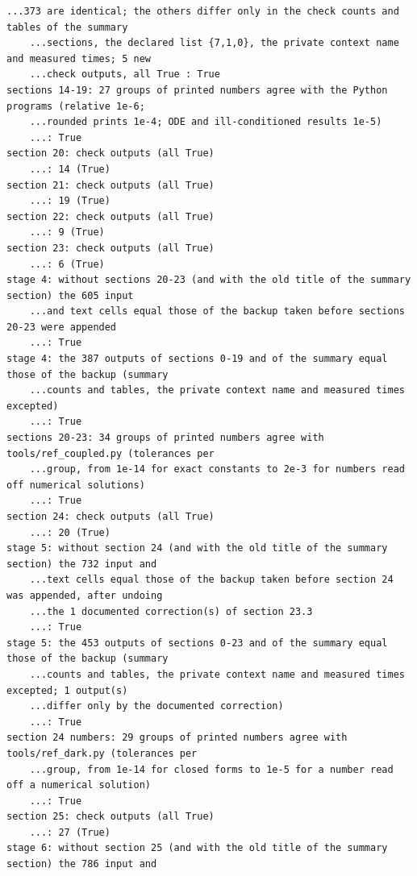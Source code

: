 \documentclass[10pt,a4paper]{article}
\begin{document}
\begin{Verbatim}[fontsize=\small,frame=single,framesep=2mm]
    ...373 are identical; the others differ only in the check counts and tables of the summary
    ...sections, the declared list {7,1,0}, the private context name and measured times; 5 new
    ...check outputs, all True : True
sections 14-19: 27 groups of printed numbers agree with the Python programs (relative 1e-6;
    ...rounded prints 1e-4; ODE and ill-conditioned results 1e-5)                              
    ...: True
section 20: check outputs (all True)                                                           
    ...: 14 (True)
section 21: check outputs (all True)                                                           
    ...: 19 (True)
section 22: check outputs (all True)                                                           
    ...: 9 (True)
section 23: check outputs (all True)                                                           
    ...: 6 (True)
stage 4: without sections 20-23 (and with the old title of the summary section) the 605 input
    ...and text cells equal those of the backup taken before sections 20-23 were appended      
    ...: True
stage 4: the 387 outputs of sections 0-19 and of the summary equal those of the backup (summary
    ...counts and tables, the private context name and measured times excepted)                
    ...: True
sections 20-23: 34 groups of printed numbers agree with tools/ref_coupled.py (tolerances per
    ...group, from 1e-14 for exact constants to 2e-3 for numbers read off numerical solutions) 
    ...: True
section 24: check outputs (all True)                                                           
    ...: 20 (True)
stage 5: without section 24 (and with the old title of the summary section) the 732 input and
    ...text cells equal those of the backup taken before section 24 was appended, after undoing
    ...the 1 documented correction(s) of section 23.3                                          
    ...: True
stage 5: the 453 outputs of sections 0-23 and of the summary equal those of the backup (summary
    ...counts and tables, the private context name and measured times excepted; 1 output(s)
    ...differ only by the documented correction)                                               
    ...: True
section 24 numbers: 29 groups of printed numbers agree with tools/ref_dark.py (tolerances per
    ...group, from 1e-14 for closed forms to 1e-5 for a number read off a numerical solution)  
    ...: True
section 25: check outputs (all True)                                                           
    ...: 27 (True)
stage 6: without section 25 (and with the old title of the summary section) the 786 input and

\end{Verbatim}
\end{document}
